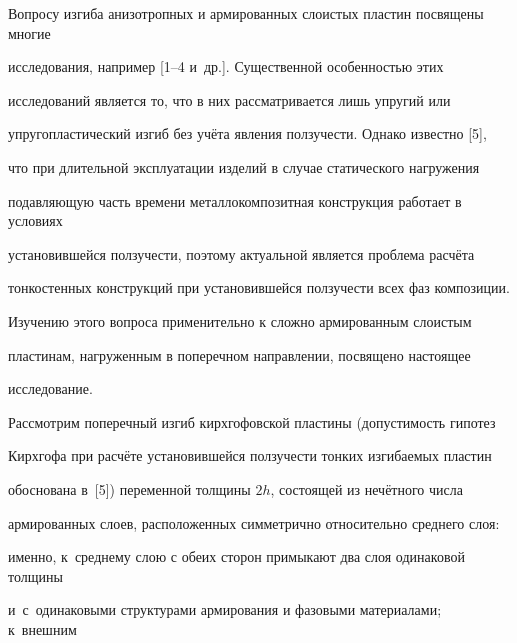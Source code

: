


\date{23/VI/2008}







\maketitle



Вопросу изгиба анизотропных и армированных слоистых пластин посвящены многие 

исследования, например [1--4 и~др.]. Существенной особенностью этих 

исследований является то, что в них рассматривается лишь упругий или 

упругопластический изгиб без учёта явления ползучести. Однако известно [5], 

что при длительной эксплуатации изделий в случае статического нагружения 

подавляющую часть времени металлокомпозитная конструкция работает в условиях 

установившейся ползучести, поэтому актуальной является проблема расчёта 

тонкостенных конструкций при установившейся ползучести всех фаз композиции. 

Изучению этого вопроса применительно к сложно армированным слоистым 

пластинам, нагруженным в поперечном направлении, посвящено настоящее 

исследование.



Рассмотрим поперечный изгиб кирхгофовской пластины (допустимость гипотез 

Кирхгофа при расчёте установившейся ползучести тонких изгибаемых пластин 

обоснована в~[5]) переменной толщины $2h$, состоящей из нечётного числа 

армированных слоев, расположенных симметрично относительно среднего слоя: 

именно, к~среднему слою с обеих сторон примыкают два слоя одинаковой толщины 

и~с~одинаковыми структурами армирования и фазовыми материалами; к~внешним 

